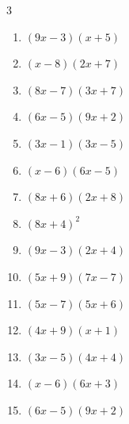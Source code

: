 \begin{multicols}{3}
\begin{enumerate}
  \item $(9x-3)(x+5)$


  \item $(x-8)(2x+7)$


  \item $(8x-7)(3x+7)$


  \item $(6x-5)(9x+2)$


  \item $(3x-1)(3x-5)$


  \item $(x-6)(6x-5)$


\columnbreak %

  \item $(8x+6)(2x+8)$


  \item $(8x+4)^{2}$


  \item $(9x-3)(2x+4)$


  \item $(5x+9)(7x-7)$


  \item $(5x-7)(5x+6)$


  \item $(4x+9)(x+1)$


  \item $(3x-5)(4x+4)$


  \item $(x-6)(6x+3)$


  \item $(6x-5)(9x+2)$


\end{enumerate}
\end{multicols}
